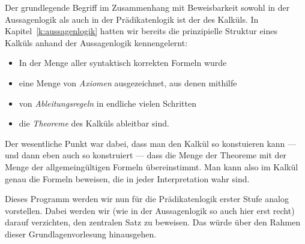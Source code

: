 Der grundlegende Begriff im Zusammenhang mit Beweisbarkeit sowohl in
der Aussagenlogik als auch in der Prädikatenlogik ist der des Kalküls.
%
In Kapitel~\ref{k:aussagenlogik} hatten wir bereits die prinzipielle
Struktur eines Kalküls anhand der Aussagenlogik kennengelernt:
\begin{itemize}
\item In der Menge aller syntaktisch korrekten Formeln wurde
\item eine Menge von \emph{Axiomen} ausgezeichnet, aus denen mithilfe
\item von \emph{Ableitungsregeln} in endliche vielen Schritten
\item die \emph{Theoreme} des Kalküls ableitbar sind.
\end{itemize}
%
Der wesentliche Punkt war dabei, dass man den Kalkül so konstuieren
kann --- und dann eben auch so konstruiert --- dass die Menge der
Theoreme mit der Menge der allgemeingültigen Formeln übereinstimmt.
%
Man kann also im Kalkül genau die Formeln beweisen, die in jeder
Interpretation wahr sind.

Dieses Programm werden wir nun für die Prädikatenlogik erster Stufe
analog vorstellen.
%
Dabei werden wir (wie in der Aussagenlogik so auch hier erst recht)
darauf verzichten, den zentralen Satz zu beweisen.
%
Das würde über den Rahmen dieser Grundlagenvorlesung hinausgehen.

